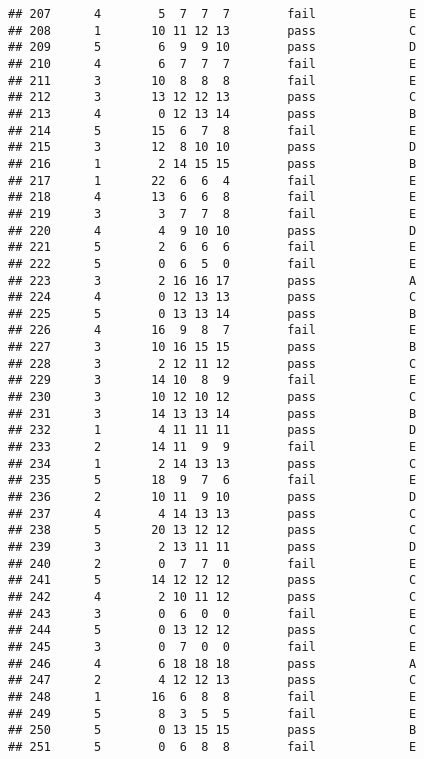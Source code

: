 \documentclass[
]{article}
\begin{document}
\begin{verbatim}
## 207      4        5  7  7  7        fail             E
## 208      1       10 11 12 13        pass             C
## 209      5        6  9  9 10        pass             D
## 210      4        6  7  7  7        fail             E
## 211      3       10  8  8  8        fail             E
## 212      3       13 12 12 13        pass             C
## 213      4        0 12 13 14        pass             B
## 214      5       15  6  7  8        fail             E
## 215      3       12  8 10 10        pass             D
## 216      1        2 14 15 15        pass             B
## 217      1       22  6  6  4        fail             E
## 218      4       13  6  6  8        fail             E
## 219      3        3  7  7  8        fail             E
## 220      4        4  9 10 10        pass             D
## 221      5        2  6  6  6        fail             E
## 222      5        0  6  5  0        fail             E
## 223      3        2 16 16 17        pass             A
## 224      4        0 12 13 13        pass             C
## 225      5        0 13 13 14        pass             B
## 226      4       16  9  8  7        fail             E
## 227      3       10 16 15 15        pass             B
## 228      3        2 12 11 12        pass             C
## 229      3       14 10  8  9        fail             E
## 230      3       10 12 10 12        pass             C
## 231      3       14 13 13 14        pass             B
## 232      1        4 11 11 11        pass             D
## 233      2       14 11  9  9        fail             E
## 234      1        2 14 13 13        pass             C
## 235      5       18  9  7  6        fail             E
## 236      2       10 11  9 10        pass             D
## 237      4        4 14 13 13        pass             C
## 238      5       20 13 12 12        pass             C
## 239      3        2 13 11 11        pass             D
## 240      2        0  7  7  0        fail             E
## 241      5       14 12 12 12        pass             C
## 242      4        2 10 11 12        pass             C
## 243      3        0  6  0  0        fail             E
## 244      5        0 13 12 12        pass             C
## 245      3        0  7  0  0        fail             E
## 246      4        6 18 18 18        pass             A
## 247      2        4 12 12 13        pass             C
## 248      1       16  6  8  8        fail             E
## 249      5        8  3  5  5        fail             E
## 250      5        0 13 15 15        pass             B
## 251      5        0  6  8  8        fail             E

\end{verbatim}
\end{document}
